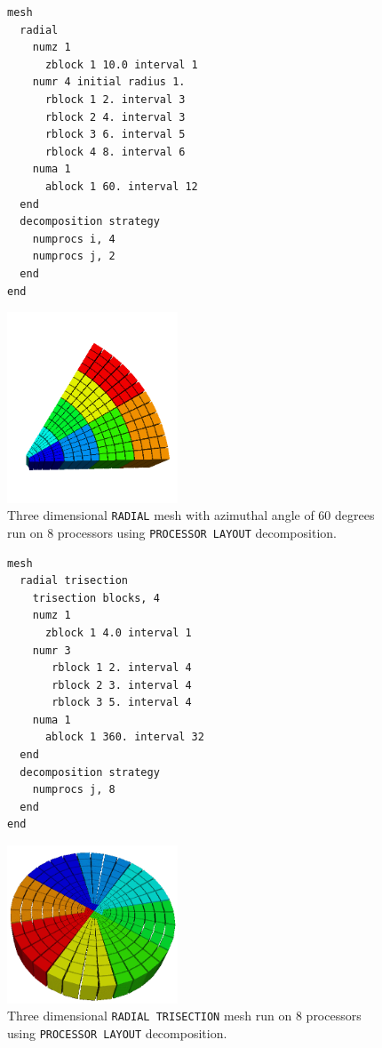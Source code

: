 \begin{figure}[htbp]
\centering
  \begin{minipage}[c]{0.4\linewidth}
    \centering
{\ttfamily \begin{verbatim}
mesh
  radial
    numz 1
      zblock 1 10.0 interval 1
    numr 4 initial radius 1.
      rblock 1 2. interval 3
      rblock 2 4. interval 3
      rblock 3 6. interval 5
      rblock 4 8. interval 6
    numa 1
      ablock 1 60. interval 12
  end
  decomposition strategy
    numprocs i, 4
    numprocs j, 2
  end
end
\end{verbatim}}
  \end{minipage}%
  \hfil
  \begin{minipage}[c]{0.6\linewidth}
    \centering
      \includegraphics[width=2.0in]{figures/numprocs_8}
  \end{minipage}
  \caption [\texttt{PROCESSOR LAYOUT} decomposition run on 8 processors.] {Three dimensional \texttt{RADIAL} mesh with azimuthal
    angle of 60 degrees run on 8 processors using \texttt{PROCESSOR LAYOUT} decomposition.}
  \label{fig:dec_pl}
\end{figure}
\begin{figure}[htbp]
\centering
  \begin{minipage}[c]{0.4\linewidth}
    \centering
{\ttfamily \begin{verbatim}
mesh
  radial trisection
    trisection blocks, 4
    numz 1
      zblock 1 4.0 interval 1
    numr 3
       rblock 1 2. interval 4
       rblock 2 3. interval 4
       rblock 3 5. interval 4
    numa 1
      ablock 1 360. interval 32
  end
  decomposition strategy
    numprocs j, 8
  end
end
\end{verbatim}}
  \end{minipage}%
  \hfil
  \begin{minipage}[c]{0.6\linewidth}
    \centering
      \includegraphics[width=2.0in]{figures/trisection_decomp}
  \end{minipage}
  \caption [\texttt{PROCESSOR LAYOUT} decomposition on 8 processors.] {Three dimensional \texttt{RADIAL TRISECTION} mesh run on 8 processors using \texttt{PROCESSOR LAYOUT} decomposition.}
  \label{fig:tri_dec}
\end{figure}


